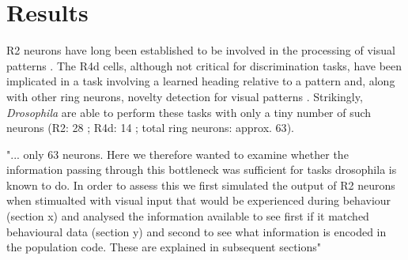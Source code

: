 
\section{Results}


R2 neurons have long been established to be involved in the processing of visual patterns \cite{Pan2009,Liu2006,Ernst1999}.
The R4d cells, although not critical for discrimination tasks, have been implicated in a task involving a learned heading relative to a pattern \cite{Guo2015} and, along with other ring neurons, novelty detection for visual patterns \cite{Solanki2015}.
Strikingly, \emph{Drosophila} are able to perform these tasks with only a tiny number of such neurons (R2: 28 \cite{Seelig2013}; R4d: 14 \cite{Seelig2013}; total ring neurons: approx. 63\cite{MartinPena2014}).


"... only 63 neurons. Here we therefore wanted to examine whether the information passing through this bottleneck was sufficient for tasks drosophila is known to do.
In order to assess this we first simulated the output of R2 neurons when stimualted with visual input that would be experienced during behaviour (section x) and 
analysed the information available to see first if it matched behavioural data (section y) and second to see what information is encoded in the population code. These are explained in subsequent sections"


